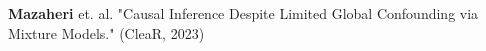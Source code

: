 \documentclass[preview]{standalone}
\begin{document}
\begin{center}
\textbf{Mazaheri} et. al. "Causal Inference Despite Limited Global Confounding via Mixture Models." (CleaR, 2023)
\end{center}
\end{document}
